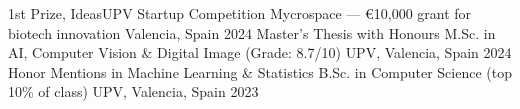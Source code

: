 

\begin{cvhonors}
  \cvhonor
      {1st Prize, IdeasUPV Startup Competition} %
      {Mycrospace --- €10,000 grant for biotech innovation} %
      {Valencia, Spain} %
      {2024} %
  \cvhonor
      {Master's Thesis with Honours} %
      {M.Sc. in AI, Computer Vision \& Digital Image (Grade: 8.7/10)} %
      {UPV, Valencia, Spain} %
      {2024} %
  \cvhonor
      {Honor Mentions in Machine Learning \& Statistics} %
      {B.Sc. in Computer Science (top 10\% of class)} %
      {UPV, Valencia, Spain} %
      {2023} %
  \end{cvhonors}
